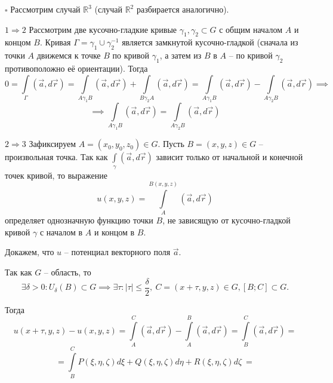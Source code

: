 \documentclass[12pt, a4paper, reqno]{article}
\begin{document}
    $\square$
    Рассмотрим случай $\mathbb{R}^3$ (случай $\mathbb{R}^2$ разбирается аналогично).

    $\boxed{1 \Rightarrow 2}$
    Рассмотрим две кусочно-гладкие кривые $\gamma_1, \gamma_2 \subset{G}$ с общим началом $A$ и
    концом $B$. Кривая $\Gamma = \gamma_1 \cup \gamma_2^{-1}$ является замкнутой кусочно-гладкой
    (сначала из точки $A$ движемся к точке $B$ по кривой $\gamma_1$, а затем из $B$ в $A$ -- по
    кривой $\gamma_2$ противоположно её ориентации). Тогда
    \begin{equation*}
        0 = \int\limits_{\Gamma} (\vec{a}, d\vec{r}) =
        \int\limits_{A \gamma_1 B} (\vec{a}, d\vec{r}) + \int\limits_{B \gamma_2 A} (\vec{a}, d\vec{r}) =
        \int\limits_{A \gamma_1 B} (\vec{a}, d\vec{r}) - \int\limits_{A \gamma_2 B} (\vec{a}, d\vec{r})
        \implies
    \end{equation*}
    \begin{equation*}
        \implies \int\limits_{A \gamma_1 B} (\vec{a}, d\vec{r}) =
        \int\limits_{A \gamma_2 B} (\vec{a}, d\vec{r})
    \end{equation*}

    $\boxed{2 \Rightarrow 3}$ Зафиксируем $A = (x_0, y_0, z_0) \in G$. Пусть $B = (x, y, z) \in G$ --
    произвольная точка. Так как $\int\limits_{\gamma} (\vec{a}, d\vec{r})$ зависит только от
    начальной и конечной точек кривой, то выражение
    \begin{equation*}
        u(x, y, z) = \int\limits_{A}^{B(x, y, z)} (\vec{a}, d\vec{r})
    \end{equation*}
    определяет однозначную функцию точки $B$, не зависящую от кусочно-гладкой кривой $\gamma$ с
    началом в $A$ и концом в $B$.

    Докажем, что $u$ -- потенциал векторного поля $\vec{a}$.

    Так как $G$ -- область, то
    \begin{equation*}
        \exists \delta > 0: U_{\delta}(B) \subset G \implies
        \exists \tau: |\tau| \leq \frac{\delta}{2},\ C = (x + \tau, y, z) \in G, [B; C] \subset G.
    \end{equation*}

    Тогда
    \begin{equation*}
        u(x + \tau, y, z) - u(x, y, z) =
        \int\limits_{A}^{C} (\vec{a}, d\vec{r}) - \int\limits_{A}^{B} (\vec{a}, d\vec{r}) =
        \int\limits_{B}^{C} (\vec{a}, d\vec{r}) =
    \end{equation*}
    \begin{equation*}
        = \int\limits_{B}^{C} P(\xi, \eta, \zeta)d\xi +
                              Q(\xi, \eta, \zeta)d\eta + R(\xi, \eta, \zeta)d\zeta\ \boxed{=}
    \end{equation*}
\end{document}
